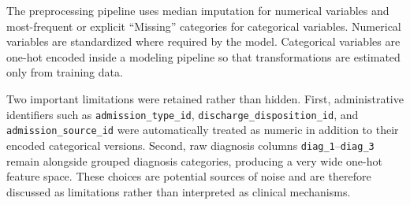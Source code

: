 \documentclass[10pt,a4paper]{article}
\begin{document}
The preprocessing pipeline uses median imputation for numerical variables and most-frequent or explicit ``Missing'' categories for categorical variables. Numerical variables are standardized where required by the model. Categorical variables are one-hot encoded inside a modeling pipeline so that transformations are estimated only from training data.

Two important limitations were retained rather than hidden. First, administrative identifiers such as \texttt{admission\_type\_id}, \texttt{discharge\_disposition\_id}, and \texttt{admission\_source\_id} were automatically treated as numeric in addition to their encoded categorical versions. Second, raw diagnosis columns \texttt{diag\_1}--\texttt{diag\_3} remain alongside grouped diagnosis categories, producing a very wide one-hot feature space. These choices are potential sources of noise and are therefore discussed as limitations rather than interpreted as clinical mechanisms.
\end{document}

